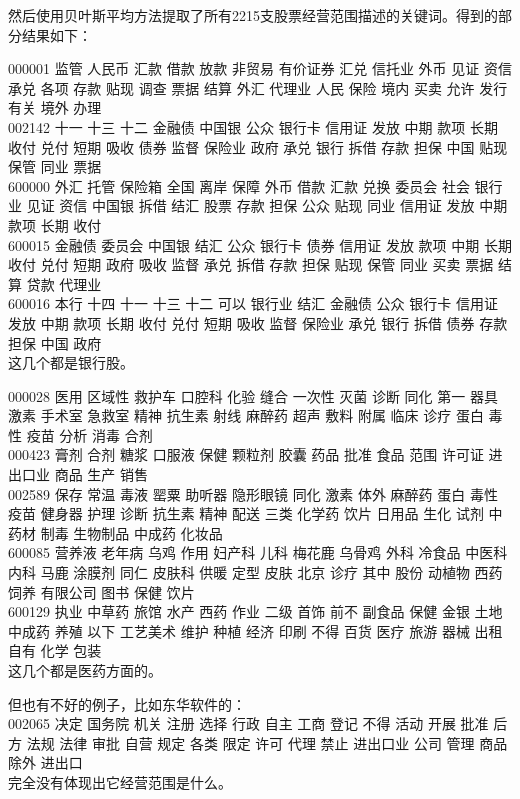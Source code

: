 \documentclass[12pt]{article}
\begin{document}
然后使用贝叶斯平均方法提取了所有2215支股票经营范围描述的关键词。得到的部分结果如下：

000001  监管 人民币 汇款 借款 放款 非贸易 有价证券 汇兑 信托业 外币 见证 资信 承兑 各项 存款 贴现 调查 票据 结算
外汇 代理业 人民 保险 境内 买卖 允许 发行 有关 境外 办理\\
002142  十一 十三 十二 金融债 中国银 公众 银行卡 信用证 发放 中期 款项 长期 收付 兑付 短期 吸收 债券 监督 保险业
政府 承兑 银行 拆借 存款 担保 中国 贴现 保管 同业 票据\\
600000  外汇 托管 保险箱 全国 离岸 保障 外币 借款 汇款 兑换 委员会 社会 银行业 见证 资信 中国银 拆借 结汇 股票 存款
担保 公众 贴现 同业 信用证 发放 中期 款项 长期 收付\\
600015  金融债 委员会 中国银 结汇 公众 银行卡 债券 信用证 发放 款项 中期 长期 收付 兑付 短期 政府 吸收 监督 承兑
拆借 存款 担保 贴现 保管 同业 买卖 票据 结算 贷款 代理业\\
600016  本行 十四 十一 十三 十二 可以 银行业 结汇 金融债 公众 银行卡 信用证 发放 中期 款项 长期 收付 兑付 短期 吸收
监督 保险业 承兑 银行 拆借 债券 存款 担保 中国 政府\\
这几个都是银行股。

000028  医用 区域性 救护车 口腔科 化验 缝合 一次性 灭菌 诊断 同化 第一 器具 激素 手术室 急救室 精神 抗生素 射线
麻醉药 超声 敷料 附属 临床 诊疗 蛋白 毒性 疫苗 分析 消毒 合剂\\
000423  膏剂 合剂 糖浆 口服液 保健 颗粒剂 胶囊 药品 批准 食品 范围 许可证 进出口业 商品 生产 销售\\
002589  保存 常温 毒液 罂粟 助听器 隐形眼镜 同化 激素 体外 麻醉药 蛋白 毒性 疫苗 健身器 护理 诊断 抗生素 精神 配送
三类 化学药 饮片 日用品 生化 试剂 中药材 制毒 生物制品 中成药 化妆品\\
600085  营养液 老年病 乌鸡 作用 妇产科 儿科 梅花鹿 乌骨鸡 外科 冷食品 中医科 内科 马鹿 涂膜剂 同仁 皮肤科 供暖 定型
皮肤 北京 诊疗 其中 股份 动植物 西药 饲养 有限公司 图书 保健 饮片\\
600129  执业 中草药 旅馆 水产 西药 作业 二级 首饰 前不 副食品 保健 金银 土地 中成药 养殖 以下 工艺美术 维护 种植
经济 印刷 不得 百货 医疗 旅游 器械 出租 自有 化学 包装\\
这几个都是医药方面的。

但也有不好的例子，比如东华软件的：\\
002065  决定 国务院 机关 注册 选择 行政 自主 工商 登记 不得 活动 开展 批准 后方 法规 法律 审批 自营 规定 各类 限定
许可 代理 禁止 进出口业 公司 管理 商品 除外 进出口\\
完全没有体现出它经营范围是什么。
\end{document}
